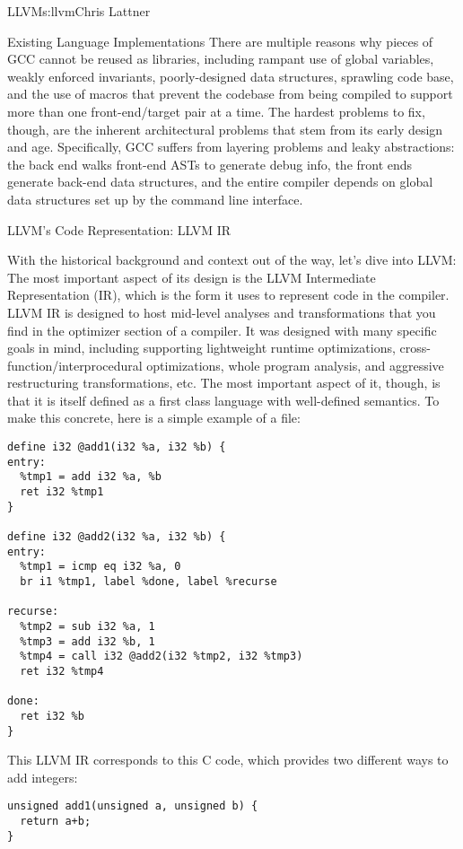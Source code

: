 \begin{aosachapter}{LLVM}{s:llvm}{Chris Lattner}
\begin{aosasect1}{Existing Language Implementations}
There are multiple reasons why pieces of GCC cannot be reused as
libraries, including rampant use of global variables, weakly enforced
invariants, poorly-designed data structures, sprawling code base, and
the use of macros that prevent the codebase from being compiled to
support more than one front-end/target pair at a time.  The hardest
problems to fix, though, are the inherent architectural problems that
stem from its early design and age.  Specifically, GCC suffers from
layering problems and leaky abstractions: the back end walks front-end
ASTs to generate debug info, the front ends generate back-end data
structures, and the entire compiler depends on global data structures
set up by the command line interface.

\end{aosasect1}

\begin{aosasect1}{LLVM's Code Representation: LLVM IR}

With the historical background and context out of the way, let's dive
into LLVM: The most important aspect of its design is the LLVM
Intermediate Representation (IR), which is the form it uses to
represent code in the compiler.  LLVM IR is designed to host mid-level
analyses and transformations that you find in the optimizer section of
a compiler.  It was designed with many specific goals in mind,
including supporting lightweight runtime optimizations,
cross-function/interprocedural optimizations, whole program analysis,
and aggressive restructuring transformations, etc.  The most important
aspect of it, though, is that it is itself defined as a first class
language with well-defined semantics. To make this concrete, here is a
simple example of a  file:

\begin{verbatim}
define i32 @add1(i32 %a, i32 %b) {
entry:
  %tmp1 = add i32 %a, %b
  ret i32 %tmp1
}

define i32 @add2(i32 %a, i32 %b) {
entry:
  %tmp1 = icmp eq i32 %a, 0
  br i1 %tmp1, label %done, label %recurse

recurse:
  %tmp2 = sub i32 %a, 1
  %tmp3 = add i32 %b, 1
  %tmp4 = call i32 @add2(i32 %tmp2, i32 %tmp3)
  ret i32 %tmp4

done:
  ret i32 %b
}
\end{verbatim}

\noindent This LLVM IR corresponds to this C code, which provides two different
ways to add integers:

\begin{verbatim}
unsigned add1(unsigned a, unsigned b) {
  return a+b;
}


\end{verbatim}
\end{aosasect1}
\end{aosachapter}
